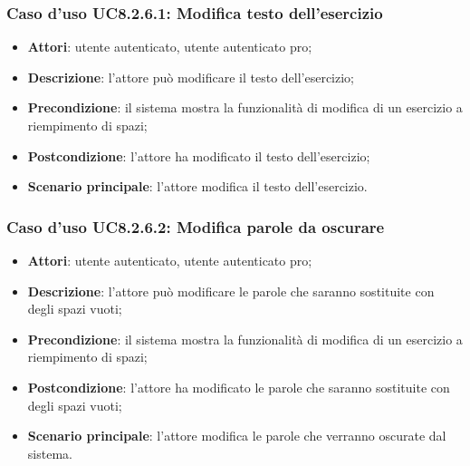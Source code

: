\subsubsection{Caso d'uso UC8.2.6.1: Modifica testo dell'esercizio}
	\begin{itemize}
		\item
			\textbf{Attori}: utente autenticato, utente autenticato pro;
		\item		
			\textbf{Descrizione}: l'attore può modificare il testo dell'esercizio;
		\item
			\textbf{Precondizione}: il sistema mostra la funzionalità di modifica di un esercizio a riempimento di spazi;
		\item
			\textbf{Postcondizione}: l'attore ha modificato il testo dell'esercizio;
		\item
			\textbf{Scenario principale}: l'attore modifica il testo dell'esercizio.
	\end{itemize}


\subsubsection{Caso d'uso UC8.2.6.2: Modifica parole da oscurare}
	\begin{itemize}
		\item
			\textbf{Attori}: utente autenticato, utente autenticato pro;
		\item		
			\textbf{Descrizione}: l'attore può modificare le parole che saranno sostituite con degli spazi vuoti;
		\item
			\textbf{Precondizione}: il sistema mostra la funzionalità di modifica di un esercizio a riempimento di spazi;
		\item
			\textbf{Postcondizione}: l'attore ha modificato le parole che saranno sostituite con degli spazi vuoti;
		\item
			\textbf{Scenario principale}: l'attore modifica le parole che verranno oscurate dal sistema.
	\end{itemize}
